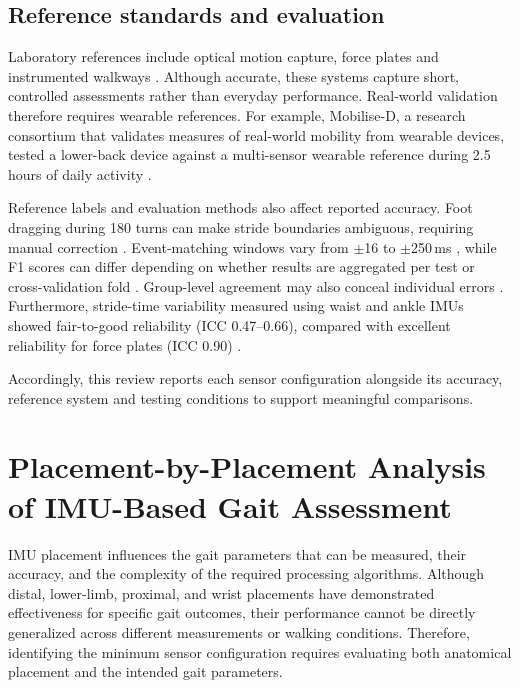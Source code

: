 \documentclass[10pt,a4paper,twocolumn]{article}
\begin{document}
\subsection{Reference standards and evaluation}

Laboratory references include optical motion capture, force plates and instrumented walkways \citep{romijnders2021,lewin2022,anderson2025}. Although accurate, these systems capture short, controlled assessments rather than everyday performance. Real-world validation therefore requires wearable references. For example, Mobilise-D, a research consortium that validates measures of real-world mobility from wearable devices, tested a lower-back device against a multi-sensor wearable reference during 2.5 hours of daily activity \citep{mico2023}.

Reference labels and evaluation methods also affect reported accuracy. Foot dragging during 180\textdegree{} turns can make stride boundaries ambiguous, requiring manual correction \citep{romijnders2021}. Event-matching windows vary from $\pm$16 to $\pm$250\,ms \citep{anderson2025}, while F1 scores can differ depending on whether results are aggregated per test or cross-validation fold \citep{kuderle2024}. Group-level agreement may also conceal individual errors \citep{lewin2023}. Furthermore, stride-time variability measured using waist and ankle IMUs showed fair-to-good reliability (ICC 0.47--0.66), compared with excellent reliability for force plates (ICC 0.90) \citep{rantalainen2020}.

Accordingly, this review reports each sensor configuration alongside its accuracy, reference system and testing conditions to support meaningful comparisons.

\section{Placement-by-Placement Analysis of IMU-Based Gait Assessment}
\label{sec:placement}

IMU placement influences the gait parameters that can be measured, their accuracy, and the complexity of the required processing algorithms. Although distal, lower-limb, proximal, and wrist placements have demonstrated effectiveness for specific gait outcomes, their performance cannot be directly generalized across different measurements or walking conditions. Therefore, identifying the minimum sensor configuration requires evaluating both anatomical placement and the intended gait parameters.
\end{document}
